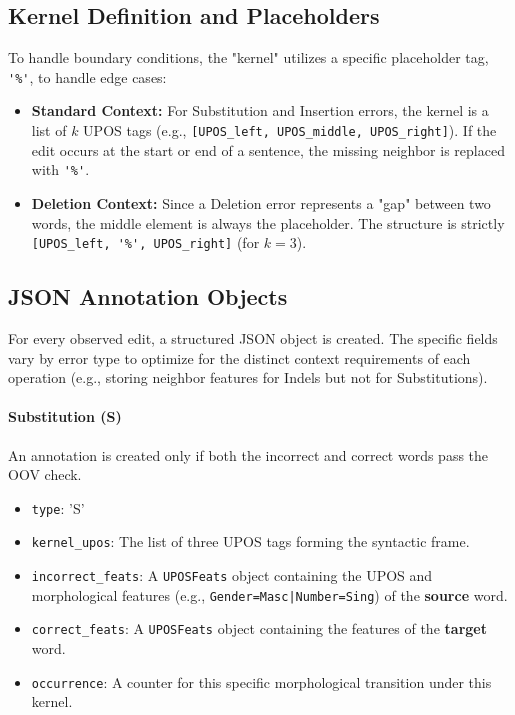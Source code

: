 \documentclass[11pt]{article}
\begin{document}
\begin{appendices}
\subsection{Kernel Definition and Placeholders}
To handle boundary conditions, the "kernel" utilizes a specific placeholder tag, \verb|'%'|, to handle edge cases:

\begin{itemize}
\setlength{\itemsep}{0pt}
\setlength{\parskip}{0pt}
    \item \textbf{Standard Context:} For Substitution and Insertion errors, the kernel is a list of $k$ UPOS tags (e.g., \verb|[UPOS_left, UPOS_middle, UPOS_right]|). If the edit occurs at the start or end of a sentence, the missing neighbor is replaced with \verb|'%'|.
    \item \textbf{Deletion Context:} Since a Deletion error represents a "gap" between two words, the middle element is always the placeholder. The structure is strictly \verb|[UPOS_left, '%', UPOS_right]| (for $k=3$).
\end{itemize}

\subsection{JSON Annotation Objects}
For every observed edit, a structured JSON object is created. The specific fields vary by error type to optimize for the distinct context requirements of each operation (e.g., storing neighbor features for Indels but not for Substitutions).

\paragraph{Substitution (S)}
An annotation is created only if both the incorrect and correct words pass the OOV check.
\begin{itemize}
\setlength{\itemsep}{0pt}
\setlength{\parskip}{0pt}
    \item \verb|type|: 'S'
    \item \verb|kernel_upos|: The list of three UPOS tags forming the syntactic frame.
    \item \verb|incorrect_feats|: A \verb|UPOSFeats| object containing the UPOS and morphological features (e.g., \texttt{Gender=Masc|Number=Sing}) of the \textbf{source} word.
    \item \verb|correct_feats|: A \verb|UPOSFeats| object containing the features of the \textbf{target} word.
    \item \verb|occurrence|: A counter for this specific morphological transition under this kernel.
\end{itemize}


\end{appendices}
\end{document}

